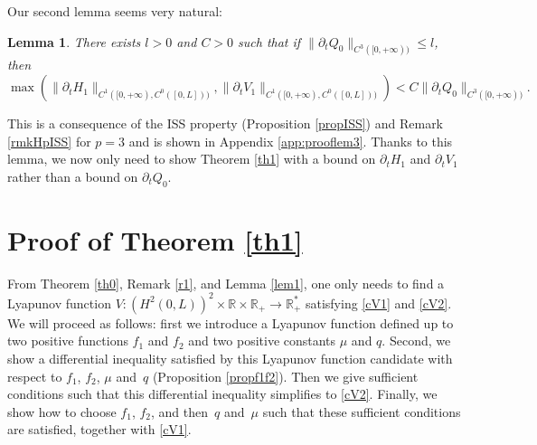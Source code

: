 \documentclass[JEP,XML,SOM,Unicode]{cedram}
\newtheorem{lem}[thm]{Lemma}
\theoremstyle{definition}
\begin{document}
Our second lemma seems very natural:
\begin{lem}\label{lem3}
There exists $l>0$ and $C>0$
such that if $\lVert\partial_{t}Q_{0}\rVert_{C^{3}([0,+\infty))}\leq l$, then
\begin{equation*}
\max\left(\lVert\partial_{t}H_{1}\rVert_{C^{1}([0,+\infty), {C^{0}([0,L])})},\lVert\partial_{t}V_{1}\rVert_{C^{1}([0,+\infty), {C^{0}([0,L])})}\right)< C \lVert\partial_{t}Q_{0}\rVert_{C^{3}([0,+\infty))}.
\end{equation*}
\end{lem}
This is a consequence of the ISS property (Proposition \ref{propISS}) and Remark \ref{rmkHpISS} for $p=3$ and is shown in Appendix \ref{app:prooflem3}.
Thanks to this lemma, we now only need to show Theorem \ref{th1} with a bound on $\partial_{t}H_{1}$ and $\partial_{t}V_{1}$ rather than a bound on $\partial_{t}Q_{0}$.

\section{{Proof of Theorem \ref{th1}}}
\label{sec:proofth1}
From Theorem {\ref{th0}}, Remark \ref{r1}, and Lemma \ref{lem1}, one only needs to find a Lyapunov function $V: (H^{2}(0,L))^{2}\times\mathbb{R}\times\mathbb{R}_{+}\to \mathbb{R}_{+}^{*}$ satisfying \eqref{cV1} and \eqref{cV2}.
{We will proceed as follows: first we introduce a Lyapunov function defined up to two positive functions $f_{1}$ and $f_{2}$ and two positive constants $\mu$ and $q$. Second, we show a differential inequality satisfied by this Lyapunov function candidate with respect to $f_{1}$, $f_{2}$, $\mu$ and~$q$ (Proposition \ref{propf1f2}). Then we give sufficient conditions such that this differential inequality simplifies to \eqref{cV2}. Finally, we show how to choose $f_{1}$, $f_{2}$, and then~$q$ and~$\mu$ such that these sufficient conditions are satisfied, together with \eqref{cV1}.}
\end{document}
